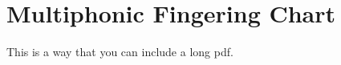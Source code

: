 \chapter{Multiphonic Fingering Chart}\label{app:Multiphonic Fingering Chart}
This is a way that you can include a long pdf.
